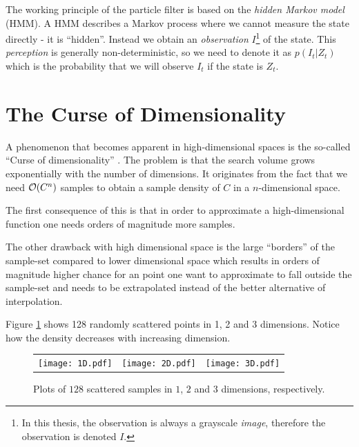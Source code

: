 The working principle of the particle filter is based on the
\emph{hidden Markov model} (HMM).  A HMM describes a Markov process
where we cannot measure the state directly - it is
``hidden''\cite{EncyclopediaMachineLearning}.  Instead we obtain an
\emph{observation} $I$\footnote{In this thesis, the observation is
always a grayscale \emph{image}, therefore the observation is denoted
$I$.}  of the state. This \emph{perception} is generally
non-deterministic, so we need to denote it as $p(I_t|Z_t)$ which is
the probability that we will observe $I_t$ if the state is $Z_t$.

\section{The Curse of Dimensionality} A phenomenon that becomes
apparent in high-dimensional spaces is the so-called ``Curse of
dimensionality'' \cite{EncyclopediaMachineLearning}.  The problem is
that the search volume grows exponentially with the number of
dimensions.  It originates from the fact that we need $\mathcal{O}{\left(C^n\right)}$
samples to obtain a sample density of $C$ in a $n$-dimensional space.

The first consequence of this is that in order to approximate a
high-dimensional function one needs orders of magnitude more samples.

The other drawback with high dimensional space is the large
``borders'' of the sample-set compared to lower dimensional space
which results in orders of magnitude higher chance for an point one
want to approximate to fall outside the sample-set and needs to be
extrapolated instead of the better alternative of interpolation.


\begin{example} Figure \ref{fig:curse-of-dimensionality} shows 128
randomly scattered points in 1, 2 and 3 dimensions. Notice how the
density decreases with increasing dimension.
  \begin{figure}
    \begin{tabular}{rcl}
      \texttt{[image: 1D.pdf]}&
      \texttt{[image: 2D.pdf]}&
      \texttt{[image: 3D.pdf]}
    \end{tabular}
    \caption{Plots of $128$ scattered samples in $1$, $2$ and $3$
dimensions, respectively.}
    \label{fig:curse-of-dimensionality}
  \end{figure}
\end{example}

